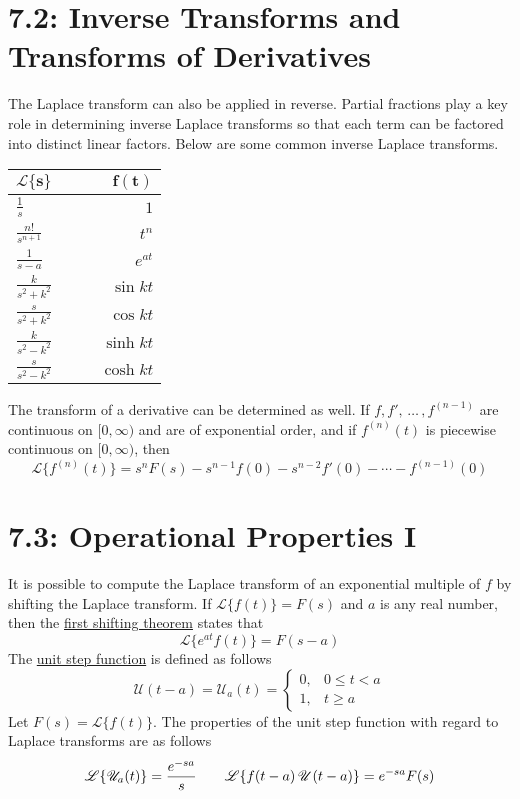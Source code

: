 \documentclass{article}
\newcommand{\lpl}{\mathscr{L}}
\begin{document}
\section*{7.2: Inverse Transforms and Transforms of Derivatives}
The Laplace transform can also be applied in reverse. Partial fractions play a key role in determining inverse Laplace transforms so that each term can be factored into distinct linear factors. Below are some common inverse Laplace transforms.
\newline
\newline
\def\arraystretch{1.5}%
\begin{tabularx}{\textwidth}{l X X r}
\toprule
\(\bm{\lpl\{s\}}\) &&& \(\bm{f(t)}\) \\
\midrule
\(\frac{1}{s}\) &&& \(1\) \\
\(\frac{n!}{s^{n+1}}\) &&& \(t^n\) \\
\(\frac{1}{s-a}\) &&& \(e^{at}\) \\
\(\frac{k}{s^2+k^2}\) &&& \(\sin kt\)\\
\(\frac{s}{s^2+k^2}\) &&& \(\cos kt\)\\
\(\frac{k}{s^2-k^2}\) &&& \(\sinh kt\)\\
\(\frac{s}{s^2-k^2}\) &&& \(\cosh kt\)\\
\bottomrule
\end{tabularx}
\newline
\newline
\newline
The transform of a derivative can be determined as well. If \(f, f',\,\hdots\,, f^{(n-1)}\) are continuous on \([0, \infty)\) and are of exponential order, and if \(f^{(n)}(t)\) is piecewise continuous on \([0,\infty)\), then
\[\lpl\{f^{(n)}(t)\}=s^nF(s)-s^{n-1}f(0)-s^{n-2}f'(0)-\cdots-f^{(n-1)}(0)\]
\section*{7.3: Operational Properties I}
It is possible to compute the Laplace transform of an exponential multiple of \(f\) by shifting the Laplace transform. If \(\lpl\{f(t)\}=F(s)\) and \(a\) is any real number, then the \underline{first shifting theorem} states that
\[\lpl\{e^{at}f(t)\}=F(s-a)\]
The \underline{unit step function} is defined as follows
\begin{equation*}
\mathscr{U}(t-a)=\mathscr{U}_a(t)=
    \begin{cases}
        0, &  0\leq t<a\\
        1, & t\geq a
    \end{cases}
\end{equation*}
Let \(F(s)=\lpl\{f(t)\}\). The properties of the unit step function with regard to Laplace transforms are as follows
\[\lpl\{\mathscr{U}_a(t)\}=\frac{e^{-sa}}{s}\hspace{7 mm}\lpl\{f(t-a)\,\mathscr{U}(t-a)\}=e^{-sa}F(s)\]
\end{document}
